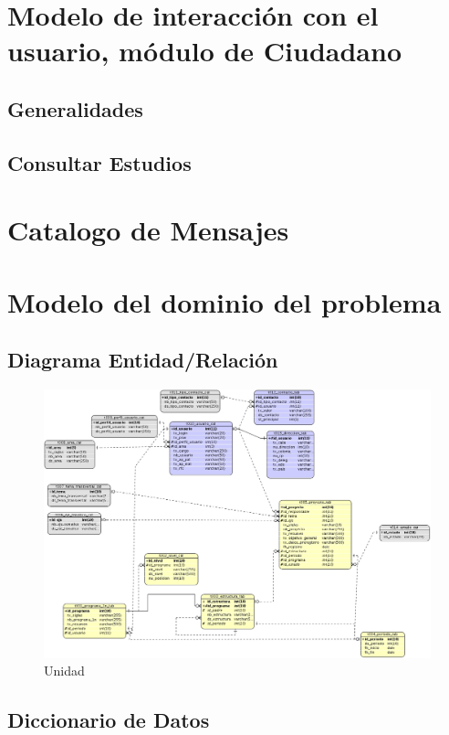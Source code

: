 \documentclass[10pt]{book}
\begin{document}

\chapter{Modelo de interacción con el usuario, módulo de Ciudadano}
\section{Generalidades}

\section{Consultar Estudios}

\chapter{Catalogo de Mensajes} 

\chapter{Modelo del dominio del problema} 

\section{Diagrama Entidad/Relación}

  	\begin{figure}[h!]
 		\centering
 			\includegraphics[width=.8\textwidth]{images/modeloER.jpg}
 		\caption{Unidad}
 	\end{figure}

\section{Diccionario de Datos}

\end{document}
